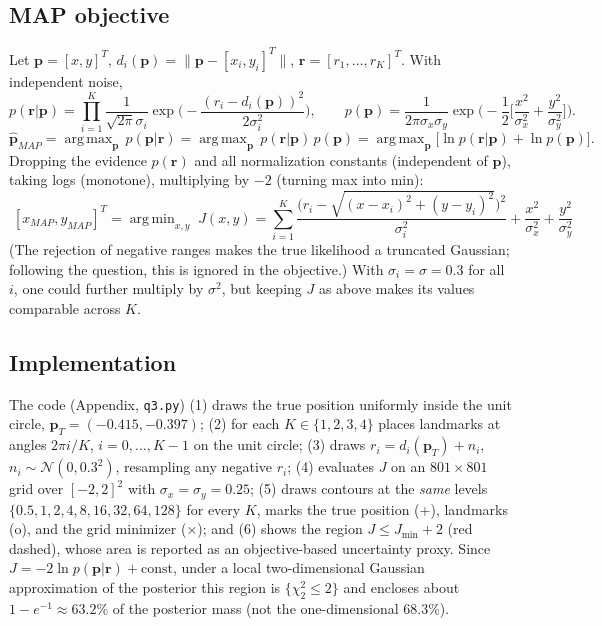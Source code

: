 \documentclass[11pt]{article}
\DeclareMathOperator*{\argmin}{arg\,min}\DeclareMathOperator*{\argmax}{arg\,max}
\begin{document}
\subsection*{MAP objective}
Let $\mathbf p=[x,y]^T$, $d_i(\mathbf p)=\|\mathbf p-[x_i,y_i]^T\|$, $\mathbf r=[r_1,\dots,r_K]^T$. With independent noise,
\[
p(\mathbf r|\mathbf p)=\prod_{i=1}^K\frac{1}{\sqrt{2\pi}\sigma_i}\exp\!\Big(-\frac{(r_i-d_i(\mathbf p))^2}{2\sigma_i^2}\Big),\qquad
p(\mathbf p)=\frac{1}{2\pi\sigma_x\sigma_y}\exp\!\Big(-\frac12\Big[\frac{x^2}{\sigma_x^2}+\frac{y^2}{\sigma_y^2}\Big]\Big).
\]
\[
\hat{\mathbf p}_{MAP}=\argmax_{\mathbf p}\,p(\mathbf p|\mathbf r)=\argmax_{\mathbf p}\,p(\mathbf r|\mathbf p)\,p(\mathbf p)
=\argmax_{\mathbf p}\Big[\ln p(\mathbf r|\mathbf p)+\ln p(\mathbf p)\Big].
\]
Dropping the evidence $p(\mathbf r)$ and all normalization constants (independent of $\mathbf p$), taking logs (monotone), multiplying by $-2$ (turning max into min):
\[
\boxed{\;[x_{MAP},y_{MAP}]^T=\argmin_{x,y}\;J(x,y)=\sum_{i=1}^K\frac{\Big(r_i-\sqrt{(x-x_i)^2+(y-y_i)^2}\Big)^2}{\sigma_i^2}+\frac{x^2}{\sigma_x^2}+\frac{y^2}{\sigma_y^2}\;}
\]
(The rejection of negative ranges makes the true likelihood a truncated Gaussian; following the question, this is ignored in the objective.) With $\sigma_i=\sigma=0.3$ for all $i$, one could further multiply by $\sigma^2$, but keeping $J$ as above makes its values comparable across $K$.

\subsection*{Implementation}
The code (Appendix, \texttt{q3.py}) (1) draws the true position uniformly inside the unit circle, $\mathbf p_T=(-0.415,-0.397)$; (2) for each $K\in\{1,2,3,4\}$ places landmarks at angles $2\pi i/K$, $i=0,\dots,K-1$ on the unit circle; (3) draws $r_i=d_i(\mathbf p_T)+n_i$, $n_i\sim\mathcal N(0,0.3^2)$, resampling any negative $r_i$; (4) evaluates $J$ on an $801\times801$ grid over $[-2,2]^2$ with $\sigma_x=\sigma_y=0.25$; (5) draws contours at the \emph{same} levels $\{0.5,1,2,4,8,16,32,64,128\}$ for every $K$, marks the true position (+), landmarks (o), and the grid minimizer (×); and (6) shows the region $J\le J_{\min}+2$ (red dashed), whose area is reported as an objective-based uncertainty proxy. Since $J=-2\ln p(\mathbf p|\mathbf r)+\text{const}$, under a local two-dimensional Gaussian approximation of the posterior this region is $\{\chi^2_2\le2\}$ and encloses about $1-e^{-1}\approx63.2\%$ of the posterior mass (not the one-dimensional 68.3\%).
\end{document}
